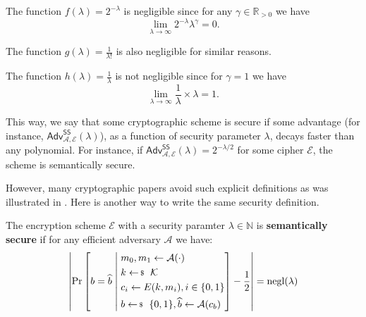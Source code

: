 \documentclass[../../book.tex]{subfiles}
\begin{document}
\begin{example}
    The function $f(\lambda) = 2^{-\lambda}$ is negligible since for any $\gamma \in \mathbb{R}_{>0}$ we have
    \begin{equation*}
        \lim_{\lambda \to \infty} 2^{-\lambda}\lambda^{\gamma} = 0.
    \end{equation*}

    The function $g(\lambda) = \frac{1}{\lambda!}$ is also negligible for similar reasons.
\end{example}

\begin{example}
    The function $h(\lambda) = \frac{1}{\lambda}$ is not negligible since for $\gamma = 1$ we have
    \begin{equation*}
        \lim_{\lambda \to \infty} \frac{1}{\lambda} \times \lambda = 1.
    \end{equation*}
\end{example}

This way, we say that some cryptographic scheme is secure if some advantage (for instance, $\textsf{Adv}^{\textsf{SS}}_{\mathcal{A},\mathcal{E}}(\lambda)$), as a function of security parameter $\lambda$, decays faster than any polynomial.
For instance, if $\textsf{Adv}^{\textsf{SS}}_{\mathcal{A},\mathcal{E}}(\lambda)=2^{-\lambda/2}$ for some cipher $\mathcal{E}$, the scheme is semantically secure.

However, many cryptographic papers avoid such explicit definitions as was illustrated in .
Here is another way to write the same security definition.

\begin{definition}\label{def:semantic-security}
    The encryption scheme $\mathcal{E}$ with a security paramter $\lambda \in \mathbb{N}$ is \textbf{semantically secure} if for any efficient adversary $\mathcal{A}$ we have:
    \begin{equation*}
        \left|\text{Pr}\left[
            b = \widehat{b}
            \;\middle|\;
        \begin{aligned}
            &m_0, m_1 \gets \mathcal{A}(\cdot) \\
            &k \leftarrowS \mathcal{K} \\
            &c_i \gets E(k,m_i), i \in \{0,1\}\\
            &b \leftarrowS \{0,1\}, \widehat{b} \gets \mathcal{A}(c_b) \\
        \end{aligned}\right] - \frac{1}{2}\right| = \text{negl}(\lambda)
    \end{equation*}
\end{definition}
\end{document}
